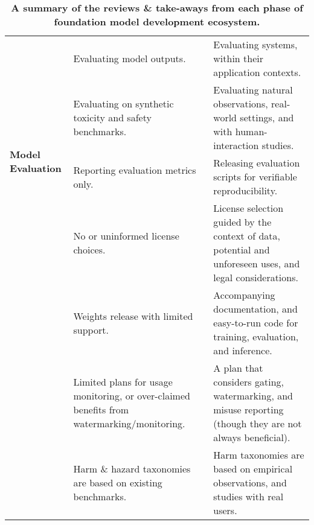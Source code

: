 \begin{table*}[t!]
\begin{adjustbox}{width=\textwidth}
\begin{tabular}{m{2.5cm} m{7cm} m{7cm}}
\midrule
\multirow{4}{*}{\textbf{Model Evaluation}} & Evaluating model outputs. & Evaluating systems, within their application contexts. \\
& Evaluating on synthetic toxicity and safety benchmarks. & Evaluating natural observations, real-world settings, and with human-interaction studies.  \\
& Reporting evaluation metrics only. & Releasing evaluation scripts for verifiable reproducibility. \\
\midrule
\multirow{4}{*}{\textbf{Model Release}} & No or uninformed license choices. & License selection guided by the context of data, potential and unforeseen uses, and legal considerations. \\
& Weights release with limited support. & Accompanying documentation, and easy-to-run code for training, evaluation, and inference.  \\
& Limited plans for usage monitoring, or over-claimed benefits from watermarking/monitoring. & A plan that considers gating, watermarking, and misuse reporting (though they are not always beneficial).  \\
& Harm \& hazard taxonomies are based on existing benchmarks. & Harm taxonomies are based on empirical observations, and studies with real users.  \\

\bottomrule
\end{tabular}
\end{adjustbox}
\caption{\textbf{A summary of the reviews \& take-aways from each phase of foundation model development ecosystem.}}
\label{tab:review-summary}
\end{table*}
